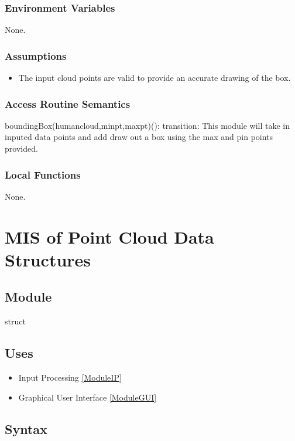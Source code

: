\documentclass[12pt, titlepage]{article}
\begin{document}
\subsubsection{Environment Variables}

None.

\subsubsection{Assumptions}

\begin{itemize}
  \item The input cloud points are valid to provide an accurate drawing of the box.
\end{itemize}

\subsubsection{Access Routine Semantics}

\noindent boundingBox(humancloud,minpt,maxpt)():
transition: This module will take in inputed data points and add draw out a box using the max and pin points provided.
\subsubsection{Local Functions}

None.
\newpage

\section{MIS of Point Cloud Data Structures} \label{ModulePCDS} 

\subsection{Module}

struct

\subsection{Uses}

\begin{itemize}
  \item Input Processing \ref{ModuleIP}
  \item Graphical User Interface \ref{ModuleGUI}
\end{itemize}

\subsection{Syntax}
\end{document}
